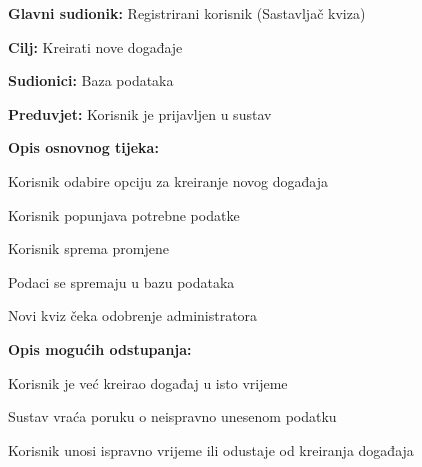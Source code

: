 				
				\noindent {}
				\begin{packed_item}
					
					\item \textbf{Glavni sudionik:} Registrirani korisnik (Sastavljač kviza)
					\item  \textbf{Cilj:} Kreirati nove događaje
					\item  \textbf{Sudionici:} Baza podataka
					\item  \textbf{Preduvjet:} Korisnik je prijavljen u sustav
					\item  \textbf{Opis osnovnog tijeka:}
					
					\item[] \begin{packed_enum}
						
						\item Korisnik odabire opciju za kreiranje novog događaja
						\item Korisnik popunjava potrebne podatke
						\item Korisnik sprema promjene
						\item Podaci se spremaju u bazu podataka
						\item Novi kviz čeka odobrenje administratora
					\end{packed_enum}
					
					\item  \textbf{Opis mogućih odstupanja:}
					
					\item[] \begin{packed_item}
						
						\item[3.a] Korisnik je već kreirao događaj u isto vrijeme
						\item[] \begin{packed_enum}
							
							\item Sustav vraća poruku o neispravno unesenom podatku
							\item Korisnik unosi ispravno vrijeme ili odustaje od kreiranja događaja
							
						\end{packed_enum}
						
					\end{packed_item}
				\end{packed_item}
				
